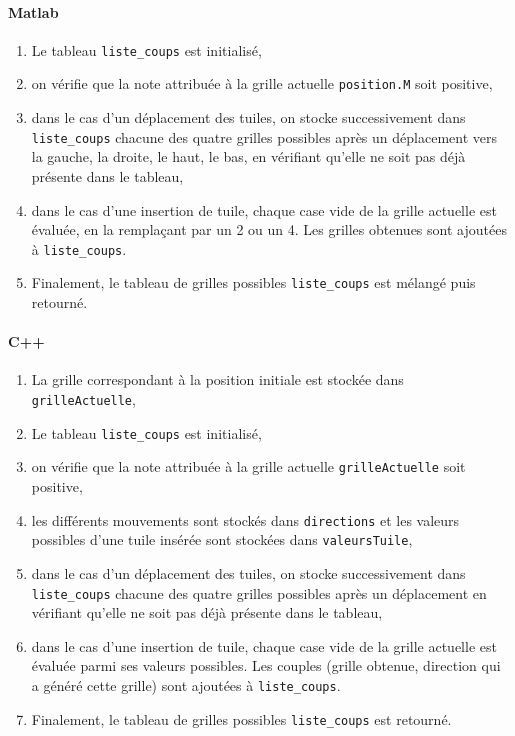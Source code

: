 \documentclass[a4paper]{report}
\begin{document}
\paragraph{Matlab}

\begin{enumerate}
\item Le tableau \verb|liste_coups| est initialisé,
\item on vérifie que la note attribuée à la grille actuelle \verb|position.M| soit positive,
\item dans le cas d'un déplacement des tuiles, on stocke successivement dans \verb|liste_coups| chacune des quatre grilles possibles après un déplacement vers la gauche, la droite, le haut, le bas, en vérifiant qu'elle ne soit pas déjà présente dans le tableau,
\item dans le cas d'une insertion de tuile, chaque case vide de la grille actuelle est évaluée, en la remplaçant par un 2 ou un 4. Les grilles obtenues sont ajoutées à \verb|liste_coups|.
\item Finalement, le tableau de grilles possibles \verb|liste_coups| est mélangé puis retourné.
\end{enumerate}

\paragraph{C++}

\begin{enumerate}
\item La grille correspondant à la position initiale est stockée dans \verb|grilleActuelle|,
\item Le tableau \verb|liste_coups| est initialisé,
\item on vérifie que la note attribuée à la grille actuelle \verb|grilleActuelle| soit positive,
\item les différents mouvements sont stockés dans \verb|directions| et les valeurs possibles d'une tuile insérée sont stockées dans \verb|valeursTuile|,
\item dans le cas d'un déplacement des tuiles, on stocke successivement dans \verb|liste_coups| chacune des quatre grilles possibles après un déplacement en vérifiant qu'elle ne soit pas déjà présente dans le tableau,
\item dans le cas d'une insertion de tuile, chaque case vide de la grille actuelle est évaluée parmi ses valeurs possibles. Les couples (grille obtenue, direction qui a généré cette grille) sont ajoutées à \verb|liste_coups|.
\item Finalement, le tableau de grilles possibles \verb|liste_coups| est retourné.
\end{enumerate}
\end{document}
